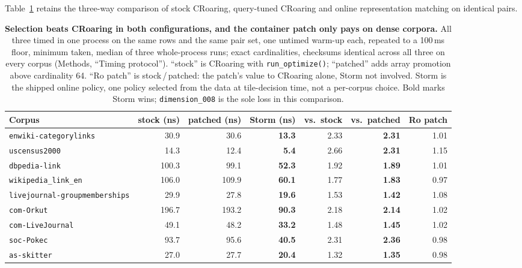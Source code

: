 Table~\ref{tab:threeway} retains the three-way comparison of stock CRoaring,
query-tuned CRoaring and online representation matching on identical pairs.

\begin{table}[!t]
\footnotesize
\setlength{\tabcolsep}{5pt}
\renewcommand\arraystretch{1.05}
\centering
\caption{\textbf{Selection beats CRoaring in both configurations, and the container patch only
pays on dense corpora.} All three timed in one process on the same rows and the same pair set,
one untimed warm-up each, repeated to a 100\,ms floor, minimum taken, median of three
whole-process runs; exact cardinalities, checksums identical across all three on every corpus
(Methods, ``Timing protocol''). ``stock'' is CRoaring with \texttt{run\_optimize()};
``patched'' adds array promotion above cardinality 64. ``Ro patch'' is stock\,/\,patched: the
patch's value to CRoaring alone, Storm not involved. Storm is the shipped online policy, one
policy selected from the data at tile-decision time, not a per-corpus choice. Bold marks Storm
wins; \texttt{dimension\_008} is the sole loss in this comparison.}
\label{tab:threeway}
\begin{tabular}{@{}l r r r r r r@{}}
\toprule
Corpus & {stock (ns)} & {patched (ns)} & {Storm (ns)} & {vs.\ stock} & {vs.\ patched} & {Ro patch} \\
\midrule
\texttt{enwiki-categorylinks} & {30.9} & {30.6} & {\textbf{13.3}} & {2.33} & {\textbf{2.31}} & {1.01} \\
\texttt{uscensus2000} & {14.3} & {12.4} & {\textbf{5.4}} & {2.66} & {\textbf{2.31}} & {1.15} \\
\texttt{dbpedia-link} & {100.3} & {99.1} & {\textbf{52.3}} & {1.92} & {\textbf{1.89}} & {1.01} \\
\texttt{wikipedia\_link\_en} & {106.0} & {109.9} & {\textbf{60.1}} & {1.77} & {\textbf{1.83}} & {0.97} \\
\texttt{livejournal-groupmemberships} & {29.9} & {27.8} & {\textbf{19.6}} & {1.53} & {\textbf{1.42}} & {1.08} \\
\texttt{com-Orkut} & {196.7} & {193.2} & {\textbf{90.3}} & {2.18} & {\textbf{2.14}} & {1.02} \\
\texttt{com-LiveJournal} & {49.1} & {48.2} & {\textbf{33.2}} & {1.48} & {\textbf{1.45}} & {1.02} \\
\texttt{soc-Pokec} & {93.7} & {95.6} & {\textbf{40.5}} & {2.31} & {\textbf{2.36}} & {0.98} \\
\texttt{as-skitter} & {27.0} & {27.7} & {\textbf{20.4}} & {1.32} & {\textbf{1.35}} & {0.98} \\

\end{tabular}
\end{table}
